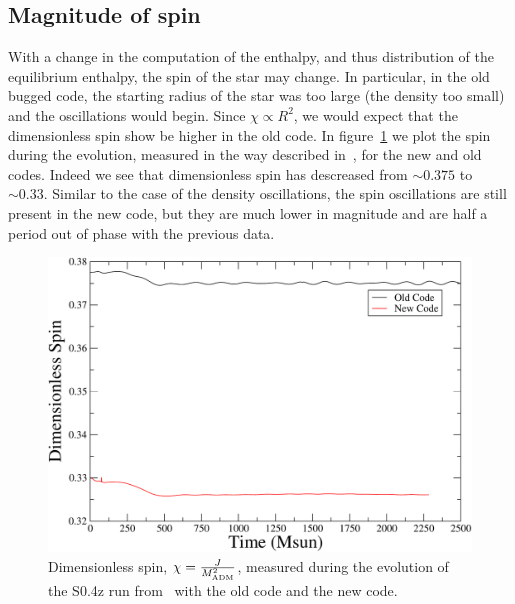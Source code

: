\subsection{Magnitude of spin}
With a change in the computation of the enthalpy, and thus
distribution of the equilibrium enthalpy, the spin of the star may
change. In particular, in the old bugged code, the starting radius of
the star was too large (the density too small) and the oscillations
would begin. Since $\chi \propto R^2$, we would expect that the
dimensionless spin show be higher in the old code. In
figure~\ref{fig:NewS4Spin} we plot the spin during the evolution,
measured in the way described in~\cite{Tacik:2015tja}, for the new
and old codes. Indeed we see that dimensionless spin has descreased
from $\sim 0.375$ to $\sim 0.33$. Similar to the case of the density
oscillations, the spin oscillations are still present in the new code,
but they are much lower in magnitude and are half a period out of
phase with the previous data.

\begin{figure}[!ht]
\includegraphics[width=0.95\columnwidth]{chap6/NewS4Spin}
\caption{\label{fig:NewS4Spin} Dimensionless spin,
  $\chi=\frac{J}{M_{\rm ADM}^2}$, measured during the
  evolution of the S0.4z run from~\cite{Tacik:2015tja} with the old
  code and the new code.}
\end{figure}

